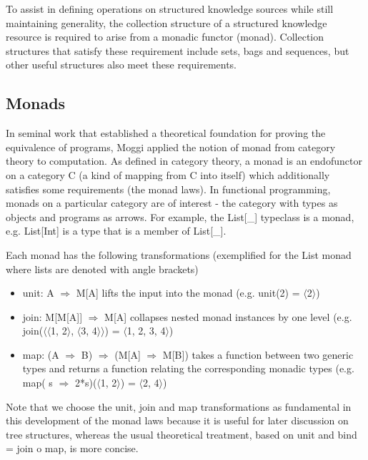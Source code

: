 \documentclass[runningheads]{llncs}
\begin{document}
To assist in defining operations on structured knowledge sources while still maintaining generality, the collection structure of a structured knowledge resource is required to arise from a monadic functor (monad). Collection structures that satisfy these requirement include sets, bags and sequences, but other useful structures also meet these requirements.

\vspace{-0.3cm}
\subsection{Monads}
In seminal work that established a theoretical foundation for proving the equivalence of programs, Moggi\cite{moggi_notions_1991} applied the notion of monad from category theory\cite{MacLane1998} to computation.
As defined in category theory, a monad  is an endofunctor on a category C (a kind of mapping from C into itself) which additionally satisfies some requirements (the monad laws).
In functional programming, monads on a particular category are of interest - the category with types as objects and programs as arrows.
For example, the List[\_] typeclass is a monad, e.g. List[Int] is a type that is a member of List[\_].

Each monad has the following transformations (exemplified for the List monad where lists are denoted with angle brackets)
\begin{itemize}
\item unit: A $\Rightarrow$ M[A] lifts the input into the monad (e.g. unit(2) = $\langle$2$\rangle$)
\item join: M[M[A]] $\Rightarrow$ M[A] collapses nested monad instances by one level (e.g. join($\langle$$\langle$1, 2$\rangle$, $\langle$3, 4$\rangle$$\rangle$) = $\langle$1, 2, 3, 4$\rangle$)
\item map: (A $\Rightarrow$ B) $\Rightarrow$ (M[A] $\Rightarrow$ M[B]) takes a function between two generic types and returns a function relating the corresponding monadic types (e.g. map( s $\Rightarrow$ 2*s)($\langle$1, 2$\rangle$) = $\langle$2, 4$\rangle$)
\end{itemize}
Note that we choose the unit, join and map transformations\cite{Wadler1992} as fundamental in this development of the monad laws because it is useful for later discussion on tree structures, whereas the usual theoretical treatment, based on unit and bind = join o map, is more concise.
\end{document}
